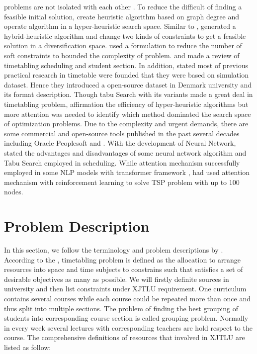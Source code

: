 \documentclass{article}
\begin{document}
problems are not isolated with each other \citep{()unitime}. To reduce the difficult of finding a feasible initial solution, \cite{(burke2007)graphbased} create heuristic algorithm based on graph degree and operate algorithm in a hyper-heuristic search space. Similar to \cite{(hertz1987)using}, \cite{(tuga2007)hybrid} generated a hybrid-heuristic algorithm and change two kinds of constraints to get a feasible solution in a diversification space. \cite{(burke2012)branchandcut} used a formulation to reduce the number of soft constraints to bounded the complexity of problem. \cite{(kristiansen2013)comprehensive} and \cite{(johnes2015)operational} made a review of timetabling scheduling and student section. In addition, \cite{(kristiansen2013)comprehensive} stated most of previous practical research in timetable were founded that they were based on simulation dataset. Hence they introduced a open-source dataset in Denmark university and its format description. Though tabu Search with its variants made a great deal in timetabling problem, \cite{(fazelzarandi2020)state} affirmation the efficiency of hyper-heuristic algorithms but more attention was needed to identify which method dominated the search space of optimization problems. Due to the complexity and urgent demands, there are some commercial and open-source tools published in the past several decades including Oracle Peoplesoft and \cite{()unitime}. With the development of Neural Network, \cite{(fazelzarandi2020)state} stated the advantages and disadvantages of some neural network algorithm and Tabu Search employed in scheduling. While attention mechanism successfully employed in some NLP models with transformer framework \citep{(ashishvaswani2017)attention,(devlin2019)bert}, \cite{(kool2019)attention} had used attention mechanism with reinforcement learning to solve TSP problem with up to 100 nodes.


\section{Problem Description}
\label{sec: Problem Description}

In this section, we follow the terminology and problem descriptions by \cite{(werra1985)introduction}. According to the \cite{(wren1996)scheduling}, timetabling problem is defined as the allocation to arrange resources into space and time subjects to constrains such that satisfies a set of desirable objectives as many as possible. We will firstly definite sources in university and then list constraints under XJTLU requirement. One curriculum contains several courses while each course could be repeated more than once and thus split into multiple sections. The problem of finding the best grouping of students into corresponding course section is called grouping problem. Normally in every week several lectures with corresponding teachers are hold respect to the course. The comprehensive definitions of resources that involved in XJTLU are listed as follow:
\end{document}
